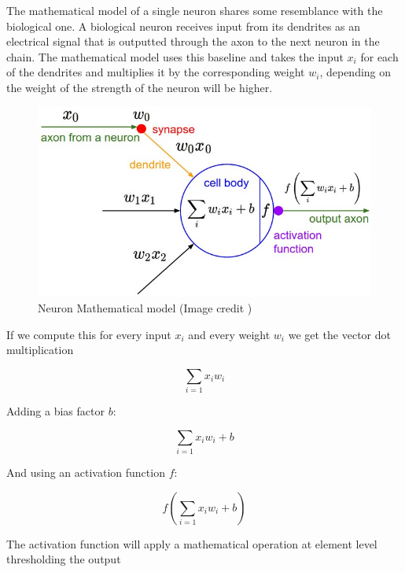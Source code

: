 The mathematical model of a single neuron shares some resemblance with the biological one.
A biological neuron receives input from its dendrites as an electrical signal that is outputted through the axon to the next neuron in the chain.
The mathematical model uses this baseline and takes the input $x_i$ for each of the dendrites and multiplies it by the corresponding weight $w_i$,
depending on the weight of the strength of the neuron will be higher. 

\begin{figure}[th]
    \centering
    \includegraphics[width=1.0\textwidth]{Figures/Neuron}
    \decoRule
    \caption[Neuron Mathematical model]{Neuron Mathematical model (Image credit \cite{cs231n})}
    \label{fig:neuron}
\end{figure}

If we compute this for every input $x_i$ and every weight $w_i$ we get the vector dot multiplication

$$ \sum_{i=1} x_i w_i  $$ 

Adding a bias factor $b$:

$$ \sum_{i=1} x_i w_i  + b$$ 

And using an activation function $f$:

$$ f(\sum_{i=1} x_i w_i + b)  $$ 

The activation function will apply a mathematical operation at element level thresholding the output

